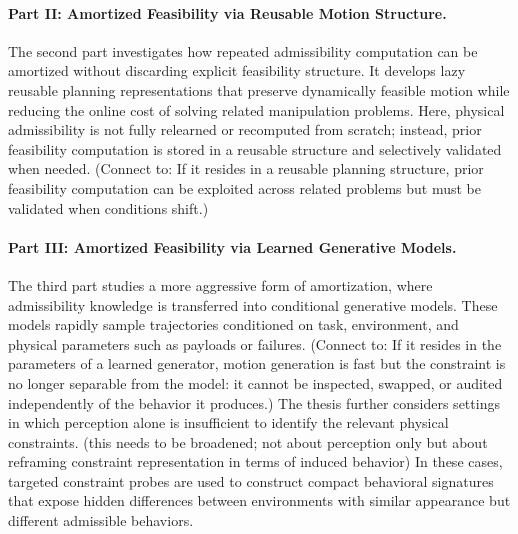 \paragraph{Part II: Amortized Feasibility via Reusable Motion Structure.}
The second part investigates how repeated admissibility computation can be amortized without discarding explicit feasibility structure.
It develops lazy reusable planning representations that preserve dynamically feasible motion while reducing the online cost of solving related manipulation problems.
Here, physical admissibility is not fully relearned or recomputed from scratch; instead, prior feasibility computation is stored in a reusable structure and selectively validated when needed.
(Connect to: If it resides in a reusable planning structure, prior feasibility computation can be exploited across related problems but must be validated when conditions shift.)


\paragraph{Part III: Amortized Feasibility via Learned Generative Models.}
The third part studies a more aggressive form of amortization, where admissibility knowledge is transferred into conditional generative models.
These models rapidly sample trajectories conditioned on task, environment, and physical parameters such as payloads or failures.
(Connect to: If it resides in the parameters of a learned generator, motion generation is fast but the constraint is no longer separable from the model: it cannot be inspected, swapped, or audited independently of the behavior it produces.)
The thesis further considers settings in which perception alone is insufficient to identify the relevant physical constraints.
(this needs to be broadened; not about perception only but about reframing constraint representation in terms of induced behavior) 
In these cases, targeted constraint probes are used to construct compact behavioral signatures that expose hidden differences between environments with similar appearance but different admissible behaviors.

